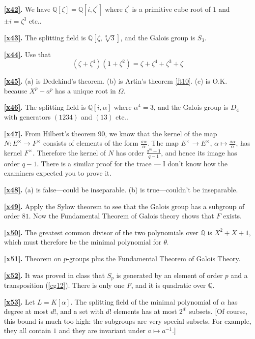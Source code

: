 \documentclass[a4paper,11pt,final,openany]{memoir}
\theoremstyle{nonumberplain}
\begin{document}
\medskip\noindent\textbf{\ref{x42}.} We have ${\mathbb{Q}}[\zeta]={\mathbb{Q}%
}[i,\zeta^{\prime}]$ where $\zeta^{\prime}$ is a primitive cube root of $1 $
and $\pm i=\zeta^{3}$ etc..

\medskip\noindent\textbf{\ref{x43}.} The splitting field is ${\mathbb{Q}%
}[\zeta,\sqrt[3]{3}]$, and the Galois group is $S_{3}$.

\medskip\noindent\textbf{\ref{x44}.} Use that%
\[
(\zeta+\zeta^{4})(1+\zeta^{2})=\zeta+\zeta^{4}+\zeta^{3}+\zeta
\]


\medskip\noindent\textbf{\ref{x45}.} (a) is Dedekind's theorem. (b) is Artin's
theorem \ref{ft10}. (c) is O.K. because $X^{p}-a^{p}$ has a unique root in
$\Omega$.

\medskip\noindent\textbf{\ref{x46}.} The splitting field is ${\mathbb{Q}%
}[i,\alpha]$ where $\alpha^{4}=3$, and the Galois group is $D_{4}$ with
generators $(1234)$ and $(13)$ etc..

\medskip\noindent\textbf{\ref{x47}.} From Hilbert's theorem 90, we know that
the kernel of the map $N\colon E^{\times}\rightarrow F^{\times}$ consists of
elements of the form $\frac{\sigma\alpha}{\alpha}$. The map $E^{\times
}\rightarrow E^{\times}$, $\alpha\mapsto\frac{\sigma\alpha}{\alpha}$, has
kernel $F^{\times}$. Therefore the kernel of $N$ has order $\frac{q^{m}%
-1}{q-1}$, and hence its image has order $q-1$. There is a similar proof for
the trace --- I don't know how the examiners expected you to prove it.

\medskip\noindent\textbf{\ref{x48}.} (a) is false---could be inseparable. (b)
is true---couldn't be inseparable.

\medskip\noindent\textbf{\ref{x49}.} Apply the Sylow theorem to see that the
Galois group has a subgroup of order $81$. Now the Fundamental Theorem of
Galois theory shows that $F$ exists.

\medskip\noindent\textbf{\ref{x50}.} The greatest common divisor of the two
polynomials over ${\mathbb{Q}}$ is $X^{2}+X+1$, which must therefore be the
minimal polynomial for $\theta$.

\medskip\noindent\textbf{\ref{x51}.} Theorem on $p$-groups plus the
Fundamental Theorem of Galois Theory.

\medskip\noindent\textbf{\ref{x52}.} It was proved in class that $S_{p}$ is
generated by an element of order $p$ and a transposition (\ref{cg12}). There
is only one $F$, and it is quadratic over ${\mathbb{Q}}$.

\medskip\noindent\textbf{\ref{x53}.} Let $L=K[\alpha]$. The splitting field of
the minimal polynomial of $\alpha$ has degree at most $d!$, and a set with
$d!$ elements has at most $2^{d!}$ subsets. [Of course, this bound is much too
high: the subgroups are very special subsets. For example, they all contain
$1$ and they are invariant under $a\mapsto a^{-1}$.]
\end{document}
